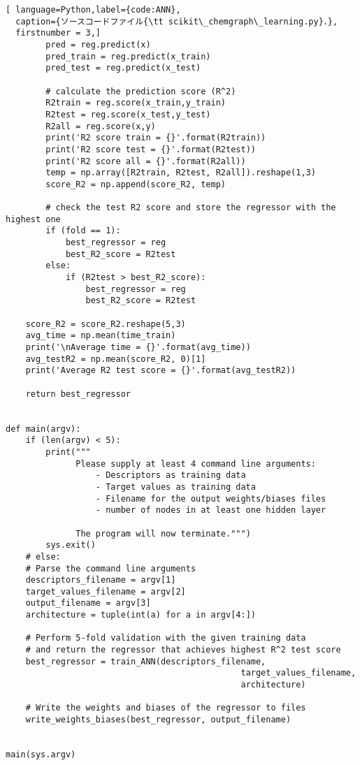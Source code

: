 \documentclass[11pt,titlepage,dvipdfmx,twoside]{jarticle}
\begin{document}
\begin{lstlisting}[ language=Python,label={code:ANN},
  caption={ソースコードファイル{\tt scikit\_chemgraph\_learning.py}．},
  firstnumber = 3,]
        pred = reg.predict(x)
        pred_train = reg.predict(x_train)
        pred_test = reg.predict(x_test)
           
        # calculate the prediction score (R^2)
        R2train = reg.score(x_train,y_train)
        R2test = reg.score(x_test,y_test)
        R2all = reg.score(x,y) 
        print('R2 score train = {}'.format(R2train))
        print('R2 score test = {}'.format(R2test))
        print('R2 score all = {}'.format(R2all))
        temp = np.array([R2train, R2test, R2all]).reshape(1,3)
        score_R2 = np.append(score_R2, temp)
        
        # check the test R2 score and store the regressor with the highest one
        if (fold == 1):
            best_regressor = reg
            best_R2_score = R2test
        else:
            if (R2test > best_R2_score):
                best_regressor = reg
                best_R2_score = R2test

    score_R2 = score_R2.reshape(5,3)
    avg_time = np.mean(time_train)
    print('\nAverage time = {}'.format(avg_time))
    avg_testR2 = np.mean(score_R2, 0)[1]
    print('Average R2 test score = {}'.format(avg_testR2))
    
    return best_regressor


def main(argv):
    if (len(argv) < 5):
        print("""
              Please supply at least 4 command line arguments:
                  - Descriptors as training data
                  - Target values as training data
                  - Filename for the output weights/biases files
                  - number of nodes in at least one hidden layer
                  
              The program will now terminate.""")
        sys.exit()
    # else:
    # Parse the command line arguments
    descriptors_filename = argv[1]
    target_values_filename = argv[2]
    output_filename = argv[3]
    architecture = tuple(int(a) for a in argv[4:])
    
    # Perform 5-fold validation with the given training data
    # and return the regressor that achieves highest R^2 test score
    best_regressor = train_ANN(descriptors_filename,
                                               target_values_filename,
                                               architecture)
    
    # Write the weights and biases of the regressor to files
    write_weights_biases(best_regressor, output_filename)
    
    
main(sys.argv)
\end{lstlisting}
\end{document}
